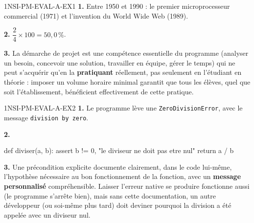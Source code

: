 \begin{corrige}{1NSI-PM-EVAL-A-EX1}
\textbf{1.} Entre 1950 et 1990 : le premier microprocesseur commercial (1971) et
l'invention du World Wide Web (1989).

\textbf{2.} $\dfrac{2}{4}\times100=50{,}0\,\%$.

\textbf{3.} La démarche de projet est une compétence essentielle du programme (analyser un
besoin, concevoir une solution, travailler en équipe, gérer le temps) qui ne peut
s'acquérir qu'en la \textbf{pratiquant} réellement, pas seulement en l'étudiant en théorie :
imposer un volume horaire minimal garantit que tous les élèves, quel que soit
l'établissement, bénéficient effectivement de cette pratique.
\end{corrige}

\begin{corrige}{1NSI-PM-EVAL-A-EX2}
\textbf{1.} Le programme lève une \lstinline{ZeroDivisionError}, avec le message
\lstinline{division by zero}.

\textbf{2.}
\begin{python}
def diviser(a, b):
    assert b != 0, "le diviseur ne doit pas etre nul"
    return a / b
\end{python}

\textbf{3.} Une précondition explicite documente clairement, dans le code lui-même,
l'hypothèse nécessaire au bon fonctionnement de la fonction, avec un \textbf{message
personnalisé} compréhensible. Laisser l'erreur native se produire fonctionne aussi (le
programme s'arrête bien), mais sans cette documentation, un autre développeur (ou soi-même
plus tard) doit deviner pourquoi la division a été appelée avec un diviseur nul.
\end{corrige}
